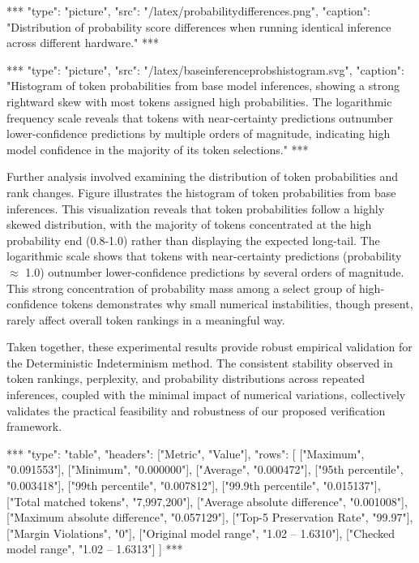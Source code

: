 \documentclass{article}
\begin{document}
\begin{center}
***
"type": "picture",
"src": "/latex/probabilitydifferences.png",
"caption": "Distribution of probability score differences when running identical inference across different hardware."
***
\end{center}

\begin{center}
***
"type": "picture",
"src": "/latex/baseinferenceprobshistogram.svg",
"caption": "Histogram of token probabilities from base model inferences, showing a strong rightward skew with most tokens assigned high probabilities. The logarithmic frequency scale reveals that tokens with near-certainty predictions outnumber lower-confidence predictions by multiple orders of magnitude, indicating high model confidence in the majority of its token selections."
***
\end{center}

Further analysis involved examining the distribution of token probabilities and rank changes. Figure illustrates the histogram of token probabilities from base inferences. This visualization reveals that token probabilities follow a highly skewed distribution, with the majority of tokens concentrated at the high probability end (0.8-1.0) rather than displaying the expected long-tail. The logarithmic scale shows that tokens with near-certainty predictions (probability $\approx$ 1.0) outnumber lower-confidence predictions by several orders of magnitude. This strong concentration of probability mass among a select group of high-confidence tokens demonstrates why small numerical instabilities, though present, rarely affect overall token rankings in a meaningful way.

Taken together, these experimental results provide robust empirical validation for the Deterministic Indeterminism method.  The consistent stability observed in token rankings, perplexity, and probability distributions across repeated inferences, coupled with the minimal impact of numerical variations, collectively validates the practical feasibility and robustness of our proposed verification framework.

\begin{center}
***
"type": "table",
"headers": ["Metric", "Value"],
"rows": [
    ["Maximum", "0.091553"],
    ["Minimum", "0.000000"],
    ["Average", "0.000472"],
    ["95th percentile", "0.003418"],
    ["99th percentile", "0.007812"],
    ["99.9th percentile", "0.015137"],
    ["Total matched tokens", "7,997,200"],
    ["Average absolute difference", "0.001008"],
    ["Maximum absolute difference", "0.057129"],
    ["Top-5 Preservation Rate", "99.97"],
    ["Margin Violations", "0"],
    ["Original model range", "1.02 -- 1.6310"],
    ["Checked model range", "1.02 -- 1.6313"]
]
***
\end{center}
\end{document}
